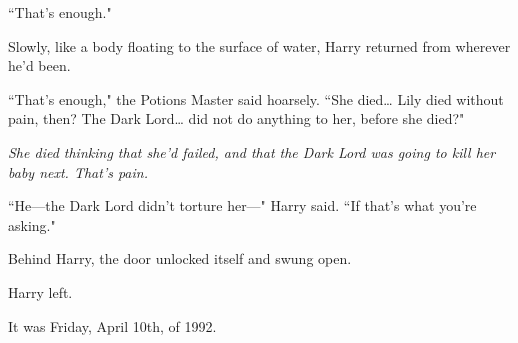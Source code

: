 ``That's enough."

Slowly, like a body floating to the surface of water, Harry returned from wherever he'd been.

``That's enough," the Potions Master said hoarsely. ``She died{\ldots} Lily died without pain, then? The Dark Lord{\ldots} did not do anything to her, before she died?"

\emph{She died thinking that she'd failed, and that the Dark Lord was going to kill her baby next. That's pain.}

``He—the Dark Lord didn't torture her—" Harry said. ``If that's what you're asking."

Behind Harry, the door unlocked itself and swung open.

Harry left.

It was Friday, April 10th, of 1992.


